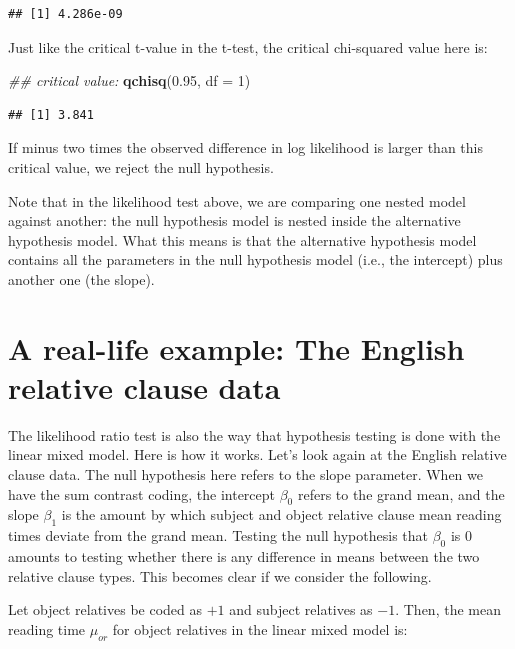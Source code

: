 \documentclass[12pt,]{krantz}
\newenvironment{Shaded}{\begin{snugshade}}{\end{snugshade}}
\newcommand{\CommentTok}[1]{\textcolor[rgb]{0.56,0.35,0.01}{\textit{#1}}}
\newcommand{\DataTypeTok}[1]{\textcolor[rgb]{0.13,0.29,0.53}{#1}}
\newcommand{\DecValTok}[1]{\textcolor[rgb]{0.00,0.00,0.81}{#1}}
\newcommand{\FloatTok}[1]{\textcolor[rgb]{0.00,0.00,0.81}{#1}}
\newcommand{\KeywordTok}[1]{\textcolor[rgb]{0.13,0.29,0.53}{\textbf{#1}}}
\newcommand{\NormalTok}[1]{#1}
\begin{document}
\begin{verbatim}
## [1] 4.286e-09
\end{verbatim}

Just like the critical t-value in the t-test, the critical chi-squared value here is:

\begin{Shaded}
\begin{Highlighting}[]
\CommentTok{## critical value:}
\KeywordTok{qchisq}\NormalTok{(}\FloatTok{0.95}\NormalTok{, }\DataTypeTok{df =} \DecValTok{1}\NormalTok{)}
\end{Highlighting}
\end{Shaded}

\begin{verbatim}
## [1] 3.841
\end{verbatim}

If minus two times the observed difference in log likelihood is larger than this critical value, we reject the null hypothesis.

Note that in the likelihood test above, we are comparing one nested model against another: the null hypothesis model is nested inside the alternative hypothesis model. What this means is that the alternative hypothesis model contains all the parameters in the null hypothesis model (i.e., the intercept) plus another one (the slope).

\hypertarget{a-real-life-example-the-english-relative-clause-data}{%
\section{A real-life example: The English relative clause data}\label{a-real-life-example-the-english-relative-clause-data}}

The likelihood ratio test is also the way that hypothesis testing is done with the linear mixed model. Here is how it works. Let's look again at the \citet{grodner} English relative clause data. The null hypothesis here refers to the slope parameter. When we have the sum contrast coding, the intercept \(\beta_0\) refers to the grand mean, and the slope \(\beta_1\) is the amount by which subject and object relative clause mean reading times deviate from the grand mean. Testing the null hypothesis that \(\beta_0\) is 0 amounts to testing whether there is any difference in means between the two relative clause types. This becomes clear if we consider the following.

Let object relatives be coded as \(+1\) and subject relatives as \(-1\). Then, the mean reading time \(\mu_{or}\) for object relatives in the linear mixed model is:
\end{document}
